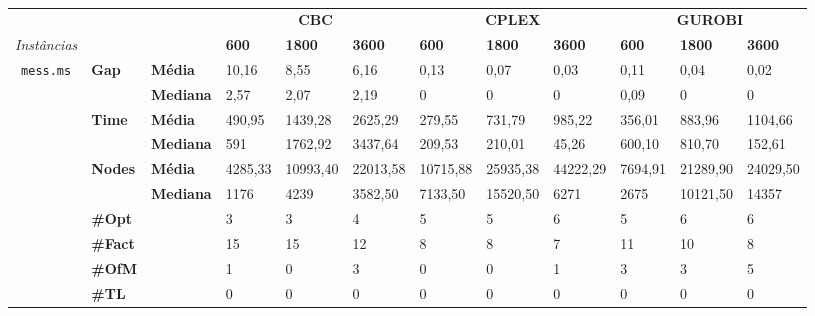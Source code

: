 
\begin{table}[]
	\begin{footnotesize}
	\begin{adjustbox}{angle=90}
	\begin{tabular}{c@{\hskip 0.2cm}l@{\hskip 0.1cm}l|lll|lll|lll}
	& & & \multicolumn{3}{c}{\textbf{CBC}} & \multicolumn{3}{c}{\textbf{CPLEX}} & \multicolumn{3}{c}{\textbf{GUROBI}} 	\\\textit{Instâncias} & & & \textbf{600} & \textbf{1800} & \textbf{3600} & \textbf{600} & \textbf{1800} & \textbf{3600} & \textbf{600} & \textbf{1800} & \textbf{3600} \\
\hline
\multirow{7}{*}{\texttt{mess.ms}} & \multirow{2}{*}{\textbf{Gap}} & \textbf{Média} & 10,16 & 8,55 & 6,16 & 0,13 & 0,07 & 0,03 & 0,11 & 0,04 & 0,02 \\
 & & \textbf{Mediana} & 2,57 & 2,07 & 2,19 & 0 & 0 & 0 & 0,09 & 0 & 0 \\
\cline{2-12}
 & \multirow{2}{*}{\textbf{Time}} & \textbf{Média} & 490,95 & 1439,28 & 2625,29 & 279,55 & 731,79 & 985,22 & 356,01 & 883,96 & 1104,66 \\
 & & \textbf{Mediana} & 591 & 1762,92 & 3437,64 & 209,53 & 210,01 & 45,26 & 600,10 & 810,70 & 152,61 \\
\cline{2-12}
 & \multirow{2}{*}{\textbf{Nodes}} & \textbf{Média} & 4285,33 & 10993,40 & 22013,58 & 10715,88 & 25935,38 & 44222,29 & 7694,91 & 21289,90 & 24029,50 \\
 & & \textbf{Mediana} & 1176 & 4239 & 3582,50 & 7133,50 & 15520,50 & 6271 & 2675 & 10121,50 & 14357 \\
\cline{2-12}
 & \textbf{\#Opt} & & 3 & 3 & 4 & 5 & 5 & 6 & 5 & 6 & 6 \\
 & \textbf{\#Fact} & & 15 & 15 & 12 & 8 & 8 & 7 & 11 & 10 & 8 \\
 & \textbf{\#OfM} & & 1 & 0 & 3 & 0 & 0 & 1 & 3 & 3 & 5 \\
 & \textbf{\#TL} & & 0 & 0 & 0 & 0 & 0 & 0 & 0 & 0 & 0 \\
	\end{tabular}
	\end{adjustbox}
	\end{footnotesize}
	\caption{}
	\label{cflp:tab:0}
\end{table}


